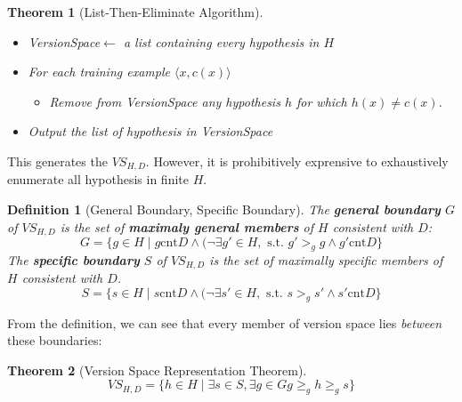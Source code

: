 \documentclass[12pt]{article}
\newtheorem{definition}{Definition}[section]
\newtheorem{theorem}{Theorem}[section]
\theoremstyle{definition}
\begin{document}
\begin{theorem}[List-Then-Eliminate Algorithm]
\hfill\\\normalfont \begin{itemize}
\item \textit{VersionSpace}$\leftarrow$ a list containing every hypothesis in $H$
\item For each training example $\langle x, c(x)\rangle$
\begin{itemize}
	\item Remove from \textit{VersionSpace} any hypothesis $h$ for which $h(x)\neq c(x)$.
\end{itemize}
\item Output the list of hypothesis in \textit{VersionSpace}
\end{itemize}
\end{theorem}
This generates the $VS_{H,D}$. However, it is prohibitively exprensive to exhaustively enumerate all hypothesis in finite $H$.
\begin{definition}[General Boundary, Specific Boundary]
\normalfont The \textbf{general boundary} $G$ of $VS_{H,D}$ is the set of \textbf{maximaly general members} of $H$ consistent with $D$:
\[
G=\{g\in H\mid g\text{cnt} D \land (\neg \exists g' \in H,\text{ s.t. } g'>_g g \land g' \text{cnt} D\}
\]
The \textbf{specific boundary} $S$ of $VS_{H,D}$ is the set of maximally specific members of $H$ consistent with $D$.
\[
S=\{s\in H\mid s\text{cnt} D \land (\neg \exists s' \in H,\text{ s.t. } s>_g s' \land s' \text{cnt} D\}
\]
\end{definition}
From the definition, we can see that every member of version space lies \textit{between} these boundaries:
\begin{theorem}[Version Space Representation Theorem]
\normalfont 
\[
VS_{H,D}=\{h\in H\mid \exists s\in S, \exists g\in G g\geq_g h\geq_g s\}
\]
\end{theorem}
\end{document}

